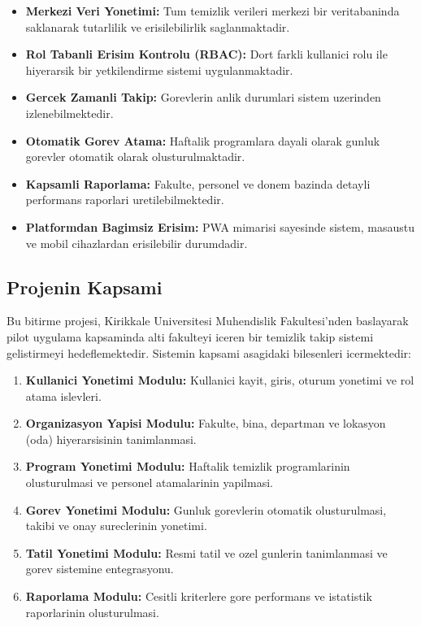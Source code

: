 \begin{itemize}
    \item \textbf{Merkezi Veri Yonetimi:} Tum temizlik verileri merkezi 
    bir veritabaninda saklanarak tutarlilik ve erisilebilirlik 
    saglanmaktadir.
    
    \item \textbf{Rol Tabanli Erisim Kontrolu (RBAC):} Dort farkli 
    kullanici rolu ile hiyerarsik bir yetkilendirme sistemi 
    uygulanmaktadir.
    
    \item \textbf{Gercek Zamanli Takip:} Gorevlerin anlik durumlari 
    sistem uzerinden izlenebilmektedir.
    
    \item \textbf{Otomatik Gorev Atama:} Haftalik programlara dayali 
    olarak gunluk gorevler otomatik olarak olusturulmaktadir.
    
    \item \textbf{Kapsamli Raporlama:} Fakulte, personel ve donem 
    bazinda detayli performans raporlari uretilebilmektedir.
    
    \item \textbf{Platformdan Bagimsiz Erisim:} PWA mimarisi sayesinde 
    sistem, masaustu ve mobil cihazlardan erisilebilir durumdadir.
\end{itemize}

\subsection{Projenin Kapsami}
\label{subsec:proje-kapsami}

Bu bitirme projesi, Kirikkale Universitesi Muhendislik Fakultesi'nden 
baslayarak pilot uygulama kapsaminda alti fakulteyi iceren bir 
temizlik takip sistemi gelistirmeyi hedeflemektedir. Sistemin 
kapsami asagidaki bilesenleri icermektedir:

\begin{enumerate}
    \item \textbf{Kullanici Yonetimi Modulu:} Kullanici kayit, giris, 
    oturum yonetimi ve rol atama islevleri.
    
    \item \textbf{Organizasyon Yapisi Modulu:} Fakulte, bina, departman 
    ve lokasyon (oda) hiyerarsisinin tanimlanmasi.
    
    \item \textbf{Program Yonetimi Modulu:} Haftalik temizlik 
    programlarinin olusturulmasi ve personel atamalarinin yapilmasi.
    
    \item \textbf{Gorev Yonetimi Modulu:} Gunluk gorevlerin otomatik 
    olusturulmasi, takibi ve onay sureclerinin yonetimi.
    
    \item \textbf{Tatil Yonetimi Modulu:} Resmi tatil ve ozel gunlerin 
    tanimlanmasi ve gorev sistemine entegrasyonu.
    
    \item \textbf{Raporlama Modulu:} Cesitli kriterlere gore performans 
    ve istatistik raporlarinin olusturulmasi.
\end{enumerate}

